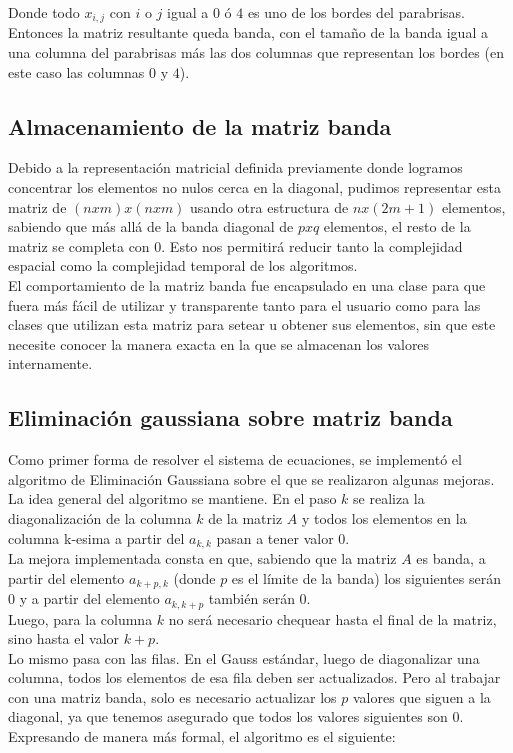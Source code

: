 Donde todo $x_{i,j}$ con $i$ o $j$ igual a $0$ ó $4$ es uno de los bordes del parabrisas.
\\
Entonces la matriz resultante queda banda, con el tamaño de la banda igual a una columna del parabrisas más las dos columnas que representan los bordes (en este caso las columnas $0$ y $4$).

\subsection{Almacenamiento de la matriz banda}

Debido a la representación matricial definida previamente donde logramos concentrar los elementos no nulos cerca en la diagonal, pudimos representar esta matriz de $(nxm)x(nxm)$ usando otra estructura de $nx(2m+1)$ elementos, sabiendo que más allá de la banda diagonal de $pxq$ elementos, el resto de la matriz se completa con $0$. Esto nos permitirá reducir tanto la complejidad espacial como la complejidad temporal de los algoritmos.
\\
El comportamiento de la matriz banda fue encapsulado en una clase para que fuera más fácil de utilizar y transparente tanto para el usuario como para las clases que utilizan esta matriz para setear u obtener sus elementos, sin que este necesite conocer la manera exacta en la que se almacenan los valores internamente.

\subsection{Eliminación gaussiana sobre matriz banda}

Como primer forma de resolver el sistema de ecuaciones, se implementó el algoritmo de Eliminación Gaussiana sobre el que se realizaron algunas mejoras. La idea general del algoritmo se mantiene. En el paso $k$ se realiza la diagonalización de la columna $k$ de la matriz $A$ y todos los elementos en la columna k-esima a partir del $a_{k,k}$ pasan a tener valor $0$.
\\
La mejora implementada consta en que, sabiendo que la matriz $A$ es banda, a partir del elemento $a_{k+p,k}$ (donde $p$ es el límite de la banda) los siguientes serán $0$ y a partir del elemento $a_{k,k+p}$ también serán $0$.
\\
Luego, para la columna $k$ no será necesario chequear hasta el final de la matriz, sino hasta el valor $k+p$.
\\
Lo mismo pasa con las filas. En el Gauss estándar, luego de diagonalizar una columna, todos los elementos de esa fila deben ser actualizados. Pero al trabajar con una matriz banda, solo es necesario actualizar los $p$ valores que siguen a la diagonal, ya que tenemos asegurado que todos los valores siguientes son $0$.
\\
Expresando de manera más formal, el algoritmo es el siguiente:

